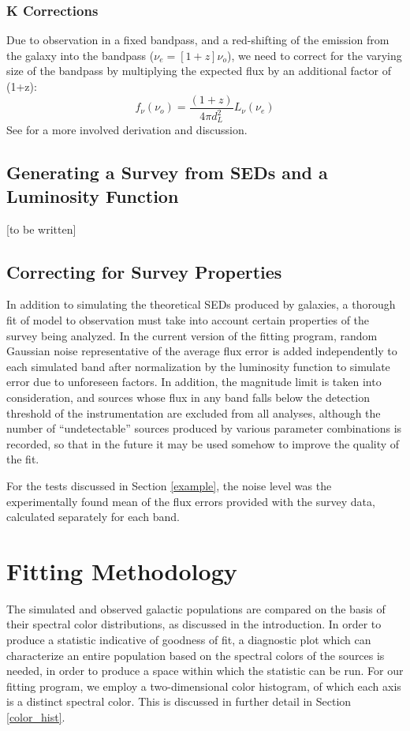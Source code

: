 \documentclass[twocolumn,letterpaper,10pt]{article}
\begin{document}
\subsubsection{K Corrections}

Due to observation in a fixed bandpass, and a red-shifting of the emission from the galaxy into the bandpass ($\nu_e=[1+z]\nu_o$), we need to correct for the varying size of the bandpass by multiplying the expected flux by an additional factor of (1+z):
$$
f_{\nu}(\nu_o)=\frac{(1+z)}{4\pi d_L^2}L_{\nu}(\nu_e)
$$
See \citet{Hogg02} for a more involved derivation and discussion.

\subsection{Generating a Survey from SEDs and a Luminosity Function}\label{generate}

[to be written]

\subsection{Correcting for Survey Properties}

In addition to simulating the theoretical SEDs produced by galaxies, a thorough fit of model to observation must take into account certain properties of the survey being analyzed. In the current version of the fitting program, random Gaussian noise representative of the average flux error is added independently to each simulated band after normalization by the luminosity function to simulate error due to unforeseen factors. In addition, the magnitude limit is taken into consideration, and sources whose flux in any band falls below the detection threshold of the instrumentation are excluded from all analyses, although the number of ``undetectable'' sources produced by various parameter combinations is recorded, so that in the future it may be used somehow to improve the quality of the fit. 

For the tests discussed in Section \ref{example}, the noise level was the experimentally found mean of the flux errors provided with the survey data, calculated separately for each band.

\section{Fitting Methodology}

The simulated and observed galactic populations are compared on the basis of their spectral color distributions, as discussed in the introduction. In order to produce a statistic indicative of goodness of fit, a diagnostic plot which can characterize an entire population based on the spectral colors of the sources is needed, in order to produce a space within which the statistic can be run. For our fitting program, we employ a two-dimensional color histogram, of which each axis is a distinct spectral color. This is discussed in further detail in Section \ref{color_hist}. 
\end{document}
